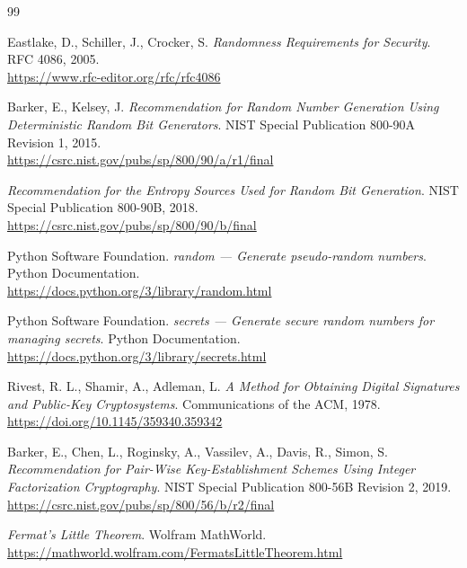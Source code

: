 \documentclass[12pt,a4paper]{article}
\begin{document}
\begin{thebibliography}{99} 

    Eastlake, D., Schiller, J., Crocker, S.
    \textit{Randomness Requirements for Security}.
    RFC 4086, 2005.
    \\
    \url{https://www.rfc-editor.org/rfc/rfc4086}

    Barker, E., Kelsey, J.
    \textit{Recommendation for Random Number Generation Using Deterministic Random Bit Generators}.
    NIST Special Publication 800-90A Revision 1, 2015.
    \\
    \url{https://csrc.nist.gov/pubs/sp/800/90/a/r1/final}

    \textit{Recommendation for the Entropy Sources Used for Random Bit Generation}.
    NIST Special Publication 800-90B, 2018.
    \\
    \url{https://csrc.nist.gov/pubs/sp/800/90/b/final}

    Python Software Foundation.
    \textit{random --- Generate pseudo-random numbers}.
    Python Documentation.
    \\
    \url{https://docs.python.org/3/library/random.html}

    Python Software Foundation.
    \textit{secrets --- Generate secure random numbers for managing secrets}.
    Python Documentation.
    \\
    \url{https://docs.python.org/3/library/secrets.html}

    Rivest, R. L., Shamir, A., Adleman, L.
    \textit{A Method for Obtaining Digital Signatures and Public-Key Cryptosystems}.
    Communications of the ACM, 1978.
    \\
    \url{https://doi.org/10.1145/359340.359342}

    Barker, E., Chen, L., Roginsky, A., Vassilev, A., Davis, R., Simon, S.
    \textit{Recommendation for Pair-Wise Key-Establishment Schemes Using Integer Factorization Cryptography}.
    NIST Special Publication 800-56B Revision 2, 2019.
    \\
    \url{https://csrc.nist.gov/pubs/sp/800/56/b/r2/final}

    \textit{Fermat's Little Theorem}.
    Wolfram MathWorld.
    \\
    \url{https://mathworld.wolfram.com/FermatsLittleTheorem.html}


\end{thebibliography}
\end{document}
